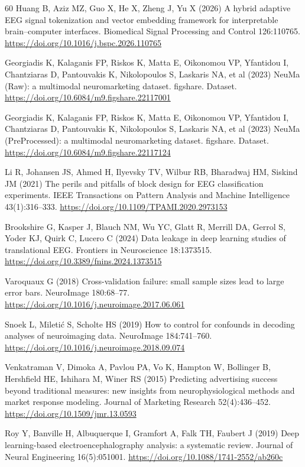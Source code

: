 \documentclass[pdflatex,sn-basic,Numbered,twocolumn,iicol]{sn-jnl}
\theoremstyle{thmstyleone}%
\theoremstyle{thmstyletwo}%
\theoremstyle{thmstylethree}%
\begin{document}
\begin{thebibliography}{60}
 Huang B, Aziz MZ, Guo X, He X, Zheng J, Yu X (2026) A hybrid adaptive EEG signal tokenization and vector embedding framework for interpretable brain--computer interfaces. Biomedical Signal Processing and Control 126:110765. \url{https://doi.org/10.1016/j.bspc.2026.110765}

 Georgiadis K, Kalaganis FP, Riskos K, Matta E, Oikonomou VP, Yfantidou I, Chantziaras D, Pantouvakis K, Nikolopoulos S, Laskaris NA, et al (2023) NeuMa (Raw): a multimodal neuromarketing dataset. figshare. Dataset. \url{https://doi.org/10.6084/m9.figshare.22117001}

 Georgiadis K, Kalaganis FP, Riskos K, Matta E, Oikonomou VP, Yfantidou I, Chantziaras D, Pantouvakis K, Nikolopoulos S, Laskaris NA, et al (2023) NeuMa (PreProcessed): a multimodal neuromarketing dataset. figshare. Dataset. \url{https://doi.org/10.6084/m9.figshare.22117124}


 Li R, Johansen JS, Ahmed H, Ilyevsky TV, Wilbur RB, Bharadwaj HM, Siskind JM (2021) The perils and pitfalls of block design for EEG classification experiments. IEEE Transactions on Pattern Analysis and Machine Intelligence 43(1):316--333. \url{https://doi.org/10.1109/TPAMI.2020.2973153}

 Brookshire G, Kasper J, Blauch NM, Wu YC, Glatt R, Merrill DA, Gerrol S, Yoder KJ, Quirk C, Lucero C (2024) Data leakage in deep learning studies of translational EEG. Frontiers in Neuroscience 18:1373515. \url{https://doi.org/10.3389/fnins.2024.1373515}

 Varoquaux G (2018) Cross-validation failure: small sample sizes lead to large error bars. NeuroImage 180:68--77. \url{https://doi.org/10.1016/j.neuroimage.2017.06.061}

 Snoek L, Mileti\'{c} S, Scholte HS (2019) How to control for confounds in decoding analyses of neuroimaging data. NeuroImage 184:741--760. \url{https://doi.org/10.1016/j.neuroimage.2018.09.074}

 Venkatraman V, Dimoka A, Pavlou PA, Vo K, Hampton W, Bollinger B, Hershfield HE, Ishihara M, Winer RS (2015) Predicting advertising success beyond traditional measures: new insights from neurophysiological methods and market response modeling. Journal of Marketing Research 52(4):436--452. \url{https://doi.org/10.1509/jmr.13.0593}

 Roy Y, Banville H, Albuquerque I, Gramfort A, Falk TH, Faubert J (2019) Deep learning-based electroencephalography analysis: a systematic review. Journal of Neural Engineering 16(5):051001. \url{https://doi.org/10.1088/1741-2552/ab260c}

\end{thebibliography}
\end{document}
